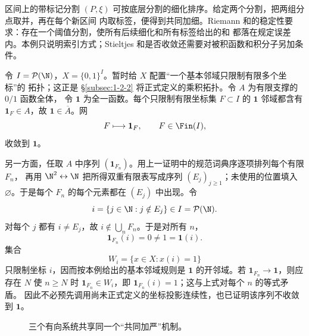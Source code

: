 \begin{example}[分割细化]\label{ex:1-1-1-2}
区间上的带标记分割 \((P,\xi)\) 可按底层分割的细化排序。给定两个分割，把两组分点取并，再在每个新区间
内取标签，便得到共同加细。Riemann 和的稳定性要求：存在一个阈值分割，使所有后续细化和所有标签给出的和
都落在规定误差内。本例只说明索引方式；Stieltjes 和是否收敛还需要对被积函数和积分子另加条件。
\end{example}

\begin{example}[闭包中没有序列逼近的点]\label{ex:1-1-1-3}
令 \(I=\mathcal P(\N)\)，\(X=\{0,1\}^{I}\)。暂时给 \(X\) 配置“一个基本邻域只限制有限多个坐标”的
拓扑；这正是 \S\ref{subsec:1-2-2} 将正式定义的乘积拓扑。令 \(A\) 为有限支撑的 \(0/1\) 函数全体，
令 \(\mathbf 1\) 为全一函数。每个只限制有限坐标集 \(F\subset I\) 的 \(\mathbf1\) 邻域都含有
\(\mathbf1_F\in A\)，故 \(\mathbf1\in\overline A\)。网
\[
  F\longmapsto\mathbf1_F,\qquad F\in\Fin(I),
\]
收敛到 \(\mathbf1\)。

另一方面，任取 \(A\) 中序列 \((\mathbf1_{F_n})\)。用上一证明中的规范词典序逐项排列每个有限 \(F_n\)，
再用 \(\N^2\leftrightarrow\N\) 把所得双重有限表写成序列 \((E_j)_{j\ge1}\)；未使用的位置填入
\(\varnothing\)。于是每个 \(F_n\) 的每个元素都在 \((E_j)\) 中出现。令
\[
  i=\{j\in\N:j\notin E_j\}\in I=\mathcal P(\N).
\]
对每个 \(j\) 都有 \(i\ne E_j\)，故 \(i\notin\bigcup_nF_n\)。于是对所有 \(n\)，
\[
  \mathbf1_{F_n}(i)=0\ne1=\mathbf1(i).
\]
集合
\[
  W_i=\{x\in X:x(i)=1\}
\]
只限制坐标 \(i\)，因而按本例给出的基本邻域规则是 \(\mathbf1\) 的开邻域。若
\(\mathbf1_{F_n}\to\mathbf1\)，则应存在 \(N\) 使 \(n\ge N\) 时
\(\mathbf1_{F_n}\in W_i\)，即 \(\mathbf1_{F_n}(i)=1\)；这与上式对每个 \(n\) 的等式矛盾。
因此不必预先调用尚未正式定义的坐标投影连续性，也已证明该序列不收敛到 \(\mathbf1\)。
\end{example}

\begin{figure}[htbp]
\centering
{}
\caption{三个有向系统共享同一个“共同加严”机制。}\label{fig:1-1-1-directed-systems}
\end{figure}

